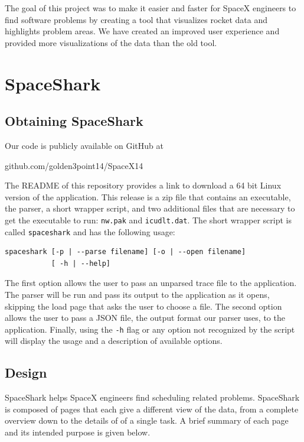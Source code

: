 \documentclass{hmcclinic}
\begin{document}
The goal of this project was to make it easier and faster for SpaceX engineers
to find software problems by creating a tool that visualizes rocket data and
highlights problem areas. We have created an improved user experience and
provided more visualizations of the data than the old tool. 
\chapter{SpaceShark}

\section{Obtaining SpaceShark}
  Our code is publicly available on GitHub at
\begin{center}
  github.com/golden3point14/SpaceX14
\end{center}
The README of this repository provides a link to download a
  64 bit Linux version of the application. This release is a zip file that
  contains an executable, the parser, a short wrapper script, and two additional
  files that are necessary to get the executable to run: \texttt{nw.pak} and
  \texttt{icudlt.dat}.
  The short wrapper script is called \texttt{spaceshark} and has the following usage:

\begin{verbatim}spaceshark [-p | --parse filename] [-o | --open filename] 
           [ -h | --help]\end{verbatim}

  The first option allows the user to pass an unparsed trace file to the
  application. The parser will be run and pass its output 
  to the application as it opens, skipping the load page that asks the
  user to choose a file. The second option allows the user to pass a
  JSON file, the output format our parser uses, to the application. Finally, using the \texttt{-h} flag or any option
  not recognized by the script will display the usage and a description of
  available options.

\section{Design}

  SpaceShark helps SpaceX engineers find scheduling related problems.
  SpaceShark is composed of pages that each give a different view of the data,
  from a complete overview down to the details of of a single task. A brief
  summary of each page and its intended purpose is given below.
\end{document}
